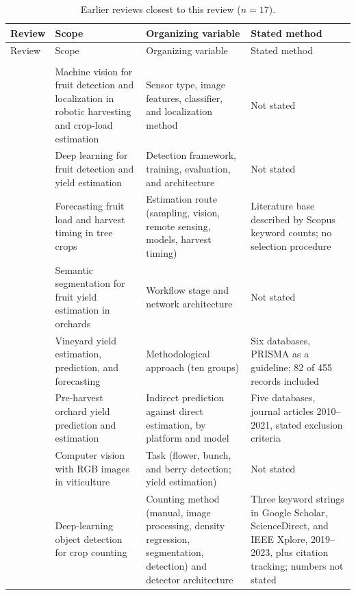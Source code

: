 \documentclass[a4paper,11pt]{article}
\begin{document}
\begin{footnotesize}
\begin{longtable}{@{}L{2.7cm}L{\dimexpr\textwidth-9.2cm-6\tabcolsep\relax}L{3.4cm}L{3.1cm}@{}}
\caption{Earlier reviews closest to this review ($n=17$).}\label{tab:position}\\
\toprule
Review & Scope & Organizing variable & Stated method\\
\midrule
\endfirsthead
\toprule
Review & Scope & Organizing variable & Stated method\\
\midrule
\endhead
\bottomrule
\endfoot
\bottomrule
{}\\
\endlastfoot
\citet{gongal2015sensors} & Machine vision for fruit detection and localization in robotic harvesting and crop-load estimation & Sensor type, image features, classifier, and localization method & Not stated\\
\citet{koirala2019deepb} & Deep learning for fruit detection and yield estimation & Detection framework, training, evaluation, and architecture & Not stated\\
\citet{anderson2021technologies} & Forecasting fruit load and harvest timing in tree crops & Estimation route (sampling, vision, remote sensing, models, harvest timing) & Literature base described by Scopus keyword counts; no selection procedure\\
\citet{maheswari2021intelligent} & Semantic segmentation for fruit yield estimation in orchards & Workflow stage and network architecture & Not stated\\
\citet{barriguinha2021vineyard} & Vineyard yield estimation, prediction, and forecasting & Methodological approach (ten groups) & Six databases, PRISMA as a guideline; 82 of 455 records included\\
\citet{he2022fruit} & Pre-harvest orchard yield prediction and estimation & Indirect prediction against direct estimation, by platform and model & Five databases, journal articles 2010--2021, stated exclusion criteria\\
\citet{mohimont2022computer} & Computer vision with RGB images in viticulture & Task (flower, bunch, and berry detection; yield estimation) & Not stated\\
\citet{huang2023survey} & Deep-learning object detection for crop counting & Counting method (manual, image processing, density regression, segmentation, detection) and detector architecture & Three keyword strings in Google Scholar, ScienceDirect, and IEEE Xplore, 2019--2023, plus citation tracking; numbers not stated\\

\end{longtable}
\end{footnotesize}
\end{document}
